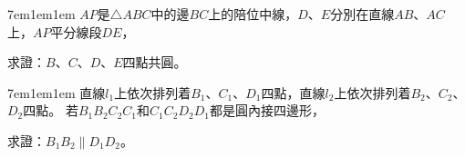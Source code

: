 \documentclass[12pt]{article}
\begin{document}
\begin{mybox}[Problem 6]{7em}{1em}{1em}
    $AP$是$\triangle{ABC}$中的邊$BC$上的陪位中線，$D$、$E$分別在直線$AB$、$AC$上，$AP$平分線段$DE$，

    求證：$B$、$C$、$D$、$E$四點共圓。
\end{mybox}
\begin{mybox}[Problem 7]{7em}{1em}{1em}
    直線$l_1$上依次排列着$B_1$、$C_1$、$D_1$四點，直線$l_2$上依次排列着$B_2$、$C_2$、$D_2$四點。
    若$B_1B_2C_2C_1$和$C_1C_2D_2D_1$都是圓內接四邊形，

    求證：$B_1B_2\parallel D_1D_2$。
\end{mybox}
\end{document}
